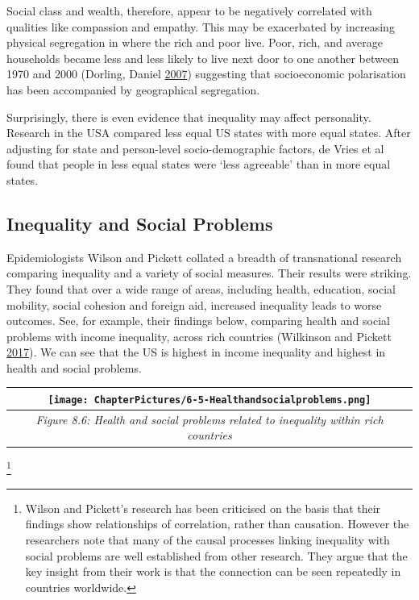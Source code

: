 \documentclass[]{tufte-handout}
\begin{document}
Social class and wealth, therefore, appear to be negatively correlated
with qualities like compassion and empathy. This may be exacerbated by
increasing physical segregation in where the rich and poor live. Poor,
rich, and average households became less and less likely to live next
door to one another between 1970 and 2000 (Dorling, Daniel
\protect\hyperlink{ref-DorlingDaniel2007}{2007}) suggesting that
socioeconomic polarisation has been accompanied by geographical
segregation.

Surprisingly, there is even evidence that inequality may affect
personality. Research in the USA compared less equal US states with more
equal states. After adjusting for state and person-level
socio-demographic factors, de Vries et al found that people in less
equal states were `less agreeable' than in more equal states.

\hypertarget{inequality-and-social-problems}{%
\subsection{Inequality and Social
Problems}\label{inequality-and-social-problems}}

Epidemiologists Wilson and Pickett collated a breadth of transnational
research comparing inequality and a variety of social measures. Their
results were striking. They found that over a wide range of areas,
including health, education, social mobility, social cohesion and
foreign aid, increased inequality leads to worse outcomes. See, for
example, their findings below, comparing health and social problems with
income inequality, across rich countries (Wilkinson and Pickett
\protect\hyperlink{ref-Wilkinson2017}{2017}). We can see that the US is
highest in income inequality and highest in health and social problems.

\begin{longtable}[]{@{}c@{}}
\toprule
\begin{minipage}[b]{0.97\columnwidth}\centering
\texttt{[image: ChapterPictures/6-5-Healthandsocialproblems.png]}\strut
\end{minipage}\tabularnewline
\midrule
\endhead
\begin{minipage}[t]{0.97\columnwidth}\centering
\emph{Figure 8.6: Health and social problems related to inequality
within rich countries}\strut
\end{minipage}\tabularnewline
\bottomrule
\end{longtable}

\footnote{Wilson and Pickett's research has been criticised on the basis
  that their findings show relationships of correlation, rather than
  causation. However the researchers note that many of the causal
  processes linking inequality with social problems are well established
  from other research. They argue that the key insight from their work
  is that the connection can be seen repeatedly in countries worldwide.}
\end{document}
